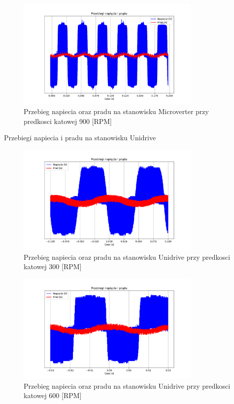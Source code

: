 \documentclass[11pt]{article}
\begin{document}
\begin{figure}[H]
\centering
\includegraphics[width=0.8\textwidth]{aun1_microverter_rpm900.pdf}
\caption{Przebieg napiecia oraz pradu na stanowisku Microverter przy predkosci katowej 900 [RPM]}
\end{figure}

Przebiegi napiecia i pradu na stanowisku Unidrive

\begin{figure}[H]
\centering
\includegraphics[width=0.8\textwidth]{aun1_unidrive_rpm300.pdf}
\caption{Przebieg napiecia oraz pradu na stanowisku Unidrive przy predkosci katowej 300 [RPM]}
\end{figure}

\begin{figure}[H]
\centering
\includegraphics[width=0.8\textwidth]{aun1_unidrive_rpm600.pdf}
\caption{Przebieg napiecia oraz pradu na stanowisku Unidrive przy predkosci katowej 600 [RPM]}
\end{figure}
\end{document}
